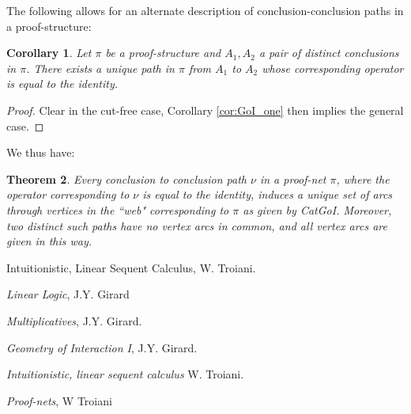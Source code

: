 \documentclass[12pt]{article}
\theoremstyle{plain}
\newtheorem{thm}{Theorem}[subsection] %
\newtheorem{cor}[thm]{Corollary}
\theoremstyle{definition}
\begin{document}
The following allows for an alternate description of conclusion-conclusion paths in a proof-structure:
\begin{cor}
Let $\pi$ be a proof-structure and $A_1,A_2$ a pair of distinct conclusions in $\pi$. There exists a unique path in $\pi$ from $A_1$ to $A_2$ whose corresponding operator is equal to the identity.
\end{cor}
\begin{proof}
Clear in the cut-free case, Corollary \ref{cor:GoI_one} then implies the general case.
\end{proof}
We thus have:
\begin{thm}
Every conclusion to conclusion path $\nu$ in a proof-net $\pi$, where the operator corresponding to $\nu$ is equal to the identity, induces a unique set of arcs through vertices in the ``\emph{web}" corresponding to $\pi$ as given by \emph{CatGoI}. Moreover, two distinct such paths have no vertex arcs in common, and all vertex arcs are given in this way.
\end{thm}

















































\providecommand{\bysame}{\leavevmode\hbox to3em{\hrulefill}\thinspace}
\providecommand{\href}[2]{#2}
\begin{thebibliography}{99}
 Intuitionistic, Linear Sequent Calculus, W. Troiani.

 \emph{Linear Logic}, J.Y. Girard

 \emph{Multiplicatives}, J.Y. Girard.

 \emph{Geometry of Interaction I}, J.Y. Girard.

 \emph{Intuitionistic, linear sequent calculus} W. Troiani.

 \emph{Proof-nets}, W Troiani


\end{thebibliography}
\end{document}
